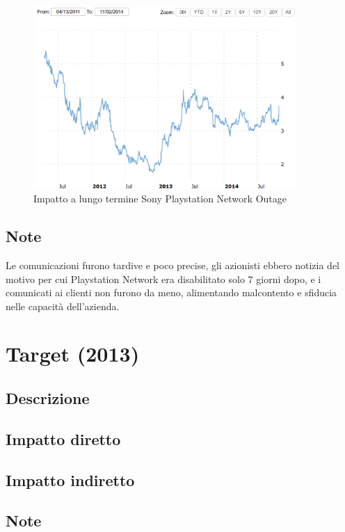 \documentclass[12pt,a4paper,openright,twoside]{report}
\begin{document}
\begin{figure}[h] 
\begin{center} 
\includegraphics[width=10cm]{figures/sony_2011_longTerm.png} 
\caption[Grafico Sony PSN short]{Impatto a lungo termine Sony Playstation Network Outage}\label{fig:pnt2}
\end{center}
\end{figure}


\subsection{Note}
Le comunicazioni furono tardive e poco precise, gli azionisti ebbero notizia del motivo per cui Playstation Network era disabilitato solo 7 giorni dopo, e i comunicati ai clienti non furono da meno, alimentando malcontento e sfiducia nelle capacit\`a dell'azienda\cite{Sony_pnt}.
\section{Target (2013)}
\subsection{Descrizione}

\subsection{Impatto diretto}

\subsection{Impatto indiretto}

\subsection{Note}
\end{document}
